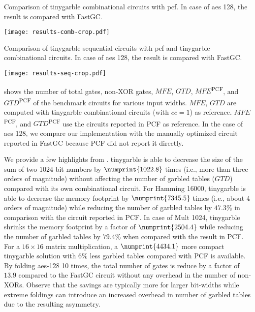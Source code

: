 \begin{table*}
\centering
\caption{Comparison of \gls{tinygarble} combinational circuits with \gls{pcf}.
In case of \acrshort{aes} 128, the result is compared with FastGC.}
\label{table:result-comb}
\texttt{[image: results-comb-crop.pdf]}
\end{table*}

\begin{table*}
\centering
\caption{Comparison of \gls{tinygarble} sequential circuits with \gls{pcf} and \gls{tinygarble} combinational circuits.
In case of \acrshort{aes} 128, the result is compared with FastGC.}
\label{table:result-seq}
\texttt{[image: results-seq-crop.pdf]}
\end{table*}

 shows the number of total gates, non-XOR gates, $\mathit{MFE}$, $\mathit{GTD}$, $\mathit{MFE}$\textsuperscript{PCF}, and $\mathit{GTD}$\textsuperscript{PCF} of the benchmark circuits for various input widths.
$\mathit{MFE}$, $\mathit{GTD}$ are computed with \gls{tinygarble} combinational circuits (with $cc=1$) as reference.
$\mathit{MFE}$\textsuperscript{PCF}, and $\mathit{GTD}$\textsuperscript{PCF} use the circuits reported in PCF as reference.
In the case of \acrshort{aes} 128, we compare our implementation with the manually optimized circuit reported in FastGC \cite{huang2011faster} because PCF did not report it directly.

We provide a few highlights from .
\gls{tinygarble} is able to decrease the size of the sum of two $1024$-bit numbers by $\numprint{1022.8}$ times (i.e., more than three orders of magnitude) without affecting the number of garbled tables ($\mathit{GTD}$) compared with its own combinational circuit.
For Hamming 16000, \gls{tinygarble} is able to decrease the memory footprint by $\numprint{7345.5}$ times (i.e., about 4 orders of magnitude) while reducing the number of garbled tables by $47.3\%$ in comparison with the circuit reported in PCF.
In case of Mult 1024, \gls{tinygarble} shrinks the memory footprint by a factor of $\numprint{2504.4}$ while reducing the number of garbled tables by $79.4\%$ when compared with the result in PCF.
For a $16\times 16$ matrix multiplication, a $\numprint{4434.1}$ more compact \gls{tinygarble} solution with $6\%$ less garbled tables compared with PCF is available.
By folding \acrshort{aes}-128 10 times, the total number of gates is reduce by a factor of $13.9$ compared to the  FastGC circuit without any overhead in the number of non-XORs.
Observe that the savings are typically more for larger bit-widths while extreme foldings can introduce an increased overhead in number of garbled tables due to the resulting asymmetry.

